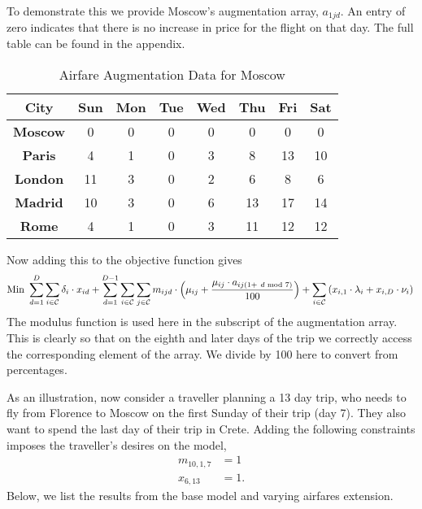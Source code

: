 \documentclass[12pt]{article}
\begin{document}
To demonstrate this we provide Moscow's augmentation array, $a_{1jd}$. An entry of zero indicates that there is no increase in price for the flight on that day. The full table can be found in the appendix.\\
\begin{table}[ht!]
	\centering
	\vspace{1mm}
	\begin{tabular}{c|c|c|c|c|c|c|c}
		\hline
		\rule{0pt}{2ex} \textbf{City} & \textbf{Sun} & \textbf{Mon} & \textbf{Tue} & \textbf{Wed} & \textbf{Thu} & \textbf{Fri} & \textbf{Sat} \\
		\hline
		\rule{0pt}{2ex}\textbf{Moscow} & 0 & 0 & 0 & 0 & 0 & 0 & 0 \\
		\textbf{Paris} & 4 & 1 & 0 & 3 & 8 & 13 & 10 \\
		\textbf{London} & 11 & 3 & 0 & 2 & 6 & 8 & 6 \\
		\textbf{Madrid} & 10 & 3 & 0 & 6 & 13 & 17 & 14 \\
		\textbf{Rome} & 4 & 1 & 0 & 3 & 11 & 12 & 12 \\ \hline
	\end{tabular}
	\caption{Airfare Augmentation Data for Moscow}
\end{table}

Now adding this to the objective function gives
\begin{equation*}
\text{Min } \sum_{d=1}^{D} \sum_{i \in \mathcal{C}} \delta_{i} \cdot x_{id} + \sum_{d=1}^{D-1} \sum_{i \in \mathcal{C}} \sum_{j \in \mathcal{C}} m_{ijd} \cdot \left(\mu_{ij} + \frac{\mu_{ij} \cdot a_{ij(1+~d \text{ mod }7)}}{100}\right) + \sum_{i \in \mathcal{C}} \left( x_{i,1} \cdot \lambda_{i} + x_{i,D} \cdot \nu_{i} \right)\\
\end{equation*}
The modulus function is used here in the subscript of the augmentation array. This is clearly so that on the eighth and later days of the trip we correctly access the corresponding element of the array. We divide by 100 here to convert from percentages.

As an illustration, now consider a traveller planning a 13 day trip, who needs to fly from Florence to Moscow on the first Sunday of their trip (day 7). They also want to spend the last day of their trip in Crete. Adding the following constraints imposes the traveller's desires on the model,
\begin{align}
m_{10,1,7} &= 1 \nonumber\\
x_{6,13} &= 1. \nonumber
\end{align}
Below, we list the results from the base model and varying airfares extension.
\end{document}
